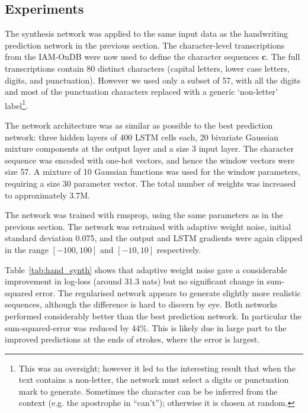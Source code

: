\subsection{Experiments}
The synthesis network was applied to the same input data as the handwriting prediction network in the previous section. The character-level transcriptions from the IAM-OnDB were now used to define the character sequences $\mathbf{c}$.
The full transcriptions contain 80 distinct characters (capital letters, lower case letters, digits, and punctuation). However we used only a subset of 57, with all the digits and most of the punctuation characters replaced with a generic `non-letter' label\footnote{This was an oversight; however it led to the interesting result that when the text contains a non-letter, the network must select a digits or punctuation mark to generate. Sometimes the character can be be inferred from the context (e.g. the apostrophe in ``can't''); otherwise it is chosen at random.}.

The network architecture was as similar as possible to the best prediction network: three hidden layers of 400 LSTM cells each, 20 bivariate Gaussian mixture components at the output layer and a size 3 input layer. The character sequence was encoded with one-hot vectors, and hence the window vectors were size 57. A mixture of 10 Gaussian functions was used for the window parameters, requiring a size 30 parameter vector. The total number of weights was increased to approximately 3.7M.

The network was trained with rmsprop, using the same parameters as in the previous section. The network was retrained with adaptive weight noise, initial standard deviation 0.075, and the output and LSTM gradients were again clipped in the range $[-100,100]$ and $[-10,10]$ respectively.

Table~\ref{tab:hand_synth} shows that adaptive weight noise gave a considerable improvement in log-loss (around 31.3 nats) but no significant change in sum-squared error. The regularised network appears to generate slightly more realistic sequences, although the difference is hard to discern by eye. Both networks performed considerably better than the best prediction network. In particular the sum-squared-error was reduced by 44$\%$.
This is likely due in large part to the improved predictions at the ends of strokes, where the error is largest.

